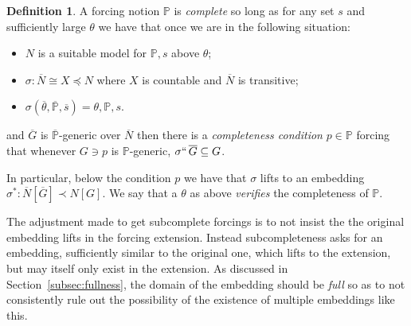 \documentclass{amsart}
\theoremstyle{definition}
\newtheorem{definition}[theorem]{Definition}
\theoremstyle{remark}
\renewcommand{\P}{\mathbb{P}}
\newcommand{\N}{{\overline{N}}}
\newcommand{\G}{\overline{G}}
\begin{document}
\begin{definition} A forcing notion $\P$ is \emph{complete} so long as
for any set $s$ and sufficiently large $\theta$ we have that once we are in the following situation: \begin{itemize}
	\item $N$ is a suitable model for $\P,s$ above $\theta$;
	\item $\sigma: \N \cong X \preccurlyeq N$ where $X$ is countable and $\N$ is transitive;
	\item $\sigma(\overline \theta, \overline{\P}, \overline s)=\theta, \P, s$.
\end{itemize}
and $\G$ is $\overline{\P}$-generic over $\N$ then there is a \emph{completeness condition} $p \in \P$ forcing that whenever $G \ni p$ is $\P$-generic, $\sigma ``\, \G \subseteq G$. 

In particular, below the condition $p$ we have that $\sigma$ lifts to an embedding $\sigma^*:\N[\G] \prec N[G]$.
We say that a $\theta$ as above \emph{verifies} the completeness of $\P$.
\end{definition}
The adjustment made to get subcomplete forcings is to not insist the the original embedding lifts in the forcing extension. Instead subcompleteness asks for an embedding, sufficiently similar
to the original one, which lifts to the extension, but may itself only exist in the extension.
As discussed in Section~\ref{subsec:fullness}, the domain of the embedding should be \emph{full} so as to not consistently rule out the possibility of the existence of multiple embeddings like this.
\end{document}
